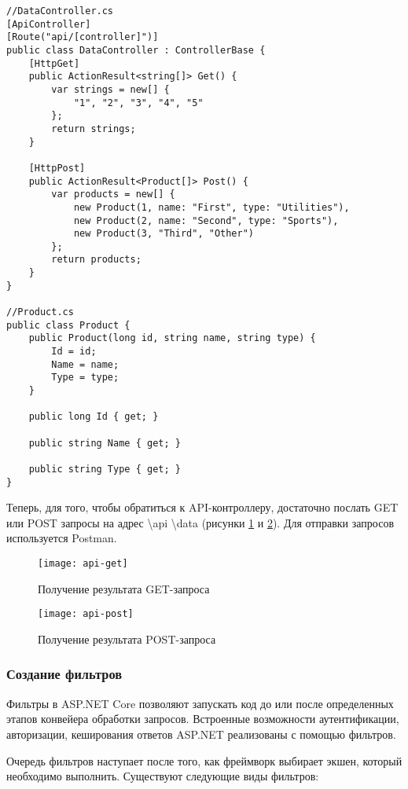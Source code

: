 \documentclass[a4paper,14pt]{extarticle}
\begin{document}
\begin{lstlisting}
//DataController.cs
[ApiController]
[Route("api/[controller]")]
public class DataController : ControllerBase {
    [HttpGet]
    public ActionResult<string[]> Get() {
        var strings = new[] {
            "1", "2", "3", "4", "5"
        };
        return strings;
    }

    [HttpPost]
    public ActionResult<Product[]> Post() {
        var products = new[] {
            new Product(1, name: "First", type: "Utilities"),
            new Product(2, name: "Second", type: "Sports"),
            new Product(3, "Third", "Other")
        };
        return products;
    }
}

//Product.cs
public class Product {
    public Product(long id, string name, string type) {
        Id = id;
        Name = name;
        Type = type;
    }

    public long Id { get; }

    public string Name { get; }

    public string Type { get; }
}
\end{lstlisting}

Теперь, для того, чтобы обратиться к API-контроллеру, достаточно послать GET или
POST запросы на адрес \textbackslash api \textbackslash data (рисунки
\ref{fig:api-get} и \ref{fig:api-post}). Для отправки запросов используется
Postman.

\begin{figure}[H]
    \centering
    \texttt{[image: api-get]}
    \caption{Получение результата GET-запроса}
    \label{fig:api-get}
\end{figure}

\begin{figure}[H]
    \centering
    \texttt{[image: api-post]}
    \caption{Получение результата POST-запроса}
    \label{fig:api-post}
\end{figure}

\subsubsection{Создание фильтров}

Фильтры в ASP.NET Core позволяют запускать код до или после определенных этапов
конвейера обработки запросов. Встроенные возможности аутентификации,
авторизации, кеширования ответов ASP.NET реализованы с помощью фильтров.

Очередь фильтров наступает после того, как фреймворк выбирает экшен, который
необходимо выполнить. Существуют следующие виды фильтров:
\end{document}
